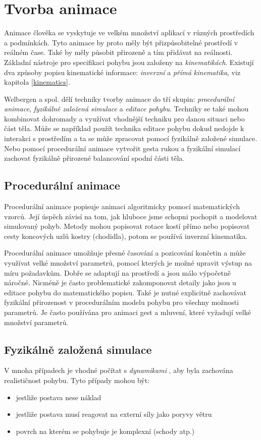 \section{Tvorba animace}
Animace člověka se vyskytuje ve velkém množství aplikací v různých prostředích a podmínkách. Tyto animace by proto měly být přizpůsobitelné prostředí v reálném čase. Také by měly působit přirozeně a tím přidávat na reálnosti. Základní nástroje pro specifikaci pohybu jsou založeny na \textit{kinematikách}. Existují dva způsoby popisu kinematické informace: \textit{inverzní} a \textit{přímá kinematika}, viz kapitola \ref{kinematics}. 

Welbergen a spol. \cite{survey} dělí techniky tvorby animace do tří skupin: \textit{procedurální animace}, \textit{fyzikálně založená simulace} a \textit{editace pohybu}. Techniky se také mohou kombinovat dohromady a využívat vhodnější techniku pro danou situaci nebo část těla. Může se například použít technika editace pohybu dokud nedojde k interakci s prostředím a ta se může zpracovat pomocí fyzikálně založené simulace. Nebo pomocí procedurální animace vytvořit gesta rukou a fyzikální simulací zachovat fyzikálně přirozené balancování spodní části těla.

\subsection{Procedurální animace}
Procedurální animace popisuje animaci algoritmicky pomocí matematických vzorců. Její úspěch závisí na tom, jak hluboce jsme schopni pochopit a modelovat simulovaný pohyb. Metody mohou popisovat rotace kostí přímo nebo popisovat cesty koncových uzlů kostry (chodidla), potom se používá inverzní kinematika. 

Procedurální animace umožňuje přesné časování a pozicování končetin a může využívat velké množství parametrů, pomocí kterých je možné upravit výstup na míru požadavkům. Dobře se adaptují na prostředí a jsou málo výpočetně náročné. Nicméně je často problematické zakomponovat detaily jako jsou u editace pohybu do matematického popisu. Také je nutné explicitně zachovávat fyzikální přirozenost v procedurálním modelu pohybu pro všechny možnosti parametrů. Je často používána pro animaci gest a mluvení, které vyžadují velké množství parametrů.

\subsection{Fyzikálně založená simulace}
V mnoha případech je vhodné počítat s \textit{dynamikami} \cite{surveyWalk}, aby byla zachována realističnost pohybu. Tyto případy mohou být:
\begin{itemize}
\item jestliže postava nese náklad
\item jestliže postava musí reagovat na externí síly jako poryvy větru
\item  povrch na kterém se pohybuje je komplexní (schody atp.)
\end{itemize}

